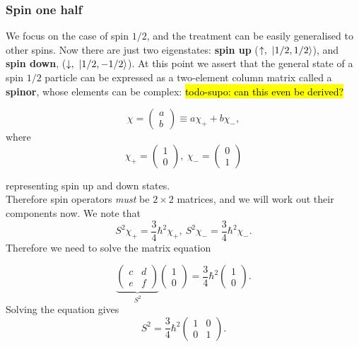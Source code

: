 \subsubsection{Spin one half}
We focus on the case of spin $1/2$, and the treatment can be easily generalised to 
other spins. Now there are just two eigenstates: 
\textbf{spin up} ($\uparrow,\ |1/2,1/2\rangle$), and \textbf{spin down}, 
($\downarrow,\ |1/2,-1/2\rgl$). At this point we assert that the general 
state of a spin $1/2$ particle can be expressed as a two-element column matrix 
called a \textbf{spinor}, whose elements can be complex: \hl{todo-supo: can this even be derived?}
\begin{singlespace}
\begin{equation}
\label{spingenstate}
\chi=
\begin{pmatrix}
	a\\
	b
\end{pmatrix}
\equiv a\chi_++b\chi_-,
\end{equation}
where 
\begin{equation}
\chi_+=
\begin{pmatrix}
	1\\
	0
\end{pmatrix},\ 
\chi_-=
\begin{pmatrix}
	0\\
	1
\end{pmatrix}
\end{equation}
\end{singlespace}
representing spin up and down states. \\
Therefore spin operators \textit{must} be $2\times2$ matrices, and we will work 
out their components now. We note that 
\begin{equation}
S^2\chi_+=\frac{3}{4}\hbar^2\chi_+,\ S^2\chi_-=\frac{3}{4}\hbar^2\chi_-.
\end{equation}
Therefore we need to solve the matrix equation
\begin{singlespace}
\begin{equation}
\underbrace{\begin{pmatrix}
	c&d\\
	e&f
\end{pmatrix}}_{S^2}
\begin{pmatrix}
	1\\
	0
\end{pmatrix}=\frac{3}{4}\hbar^2
\begin{pmatrix}
	1\\
	0
\end{pmatrix}.
\end{equation}
Solving the equation gives
\begin{equation}
S^2=\frac{3}{4}\hbar^2
\begin{pmatrix}
	1&0\\
	0&1
\end{pmatrix}.
\end{equation}
\end{singlespace}
